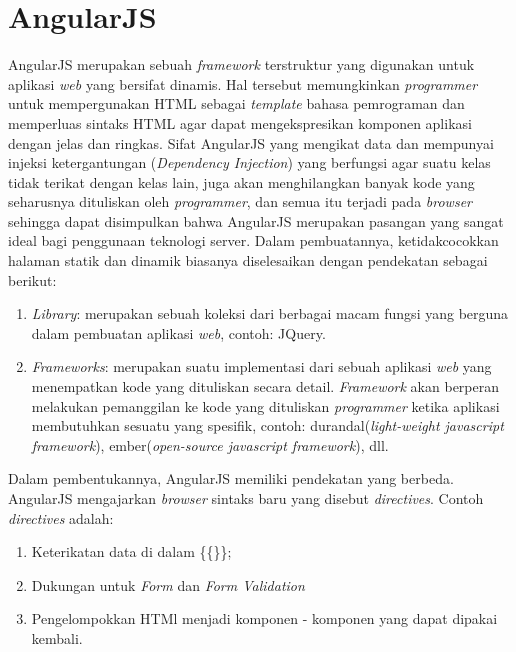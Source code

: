 \section{AngularJS}
\label{sec: angularJS}

AngularJS \cite{AngularJSDocs} merupakan sebuah \textit{framework} terstruktur yang digunakan untuk aplikasi \textit{web} yang bersifat dinamis. Hal tersebut memungkinkan \textit{programmer} untuk mempergunakan HTML sebagai \textit{template} bahasa pemrograman dan memperluas sintaks HTML agar dapat mengekspresikan komponen aplikasi dengan jelas dan ringkas. Sifat AngularJS yang mengikat data dan mempunyai injeksi ketergantungan (\textit{Dependency Injection}) yang berfungsi agar suatu kelas tidak terikat dengan kelas lain, juga akan menghilangkan banyak kode yang seharusnya dituliskan oleh \textit{programmer}, dan semua itu terjadi pada \textit{browser} sehingga dapat disimpulkan bahwa AngularJS merupakan pasangan yang sangat ideal bagi penggunaan teknologi server. 
Dalam pembuatannya, ketidakcocokkan halaman statik dan dinamik biasanya diselesaikan dengan pendekatan sebagai berikut:
\begin{enumerate}
	\item \textit{Library}: merupakan sebuah koleksi dari berbagai macam fungsi yang berguna dalam pembuatan aplikasi \textit{web}, contoh: JQuery.
	\item \textit{Frameworks}: merupakan suatu implementasi dari sebuah aplikasi \textit{web} yang menempatkan kode yang dituliskan secara detail. \textit{Framework} akan berperan melakukan pemanggilan ke kode yang dituliskan \textit{programmer} ketika aplikasi membutuhkan sesuatu yang spesifik, contoh: durandal(\textit{light-weight javascript framework}), ember(\textit{open-source javascript framework}), dll.
\end{enumerate}

Dalam pembentukannya, AngularJS memiliki pendekatan yang berbeda. AngularJS mengajarkan \textit{browser} sintaks baru yang disebut \textit{directives}. Contoh \textit{directives} adalah:
\begin{enumerate}
	\item Keterikatan data di dalam \{\{\}\};
	\item Dukungan untuk \textit{Form} dan \textit{Form Validation}
	\item Pengelompokkan HTMl menjadi komponen - komponen yang dapat dipakai kembali.
\end{enumerate}

